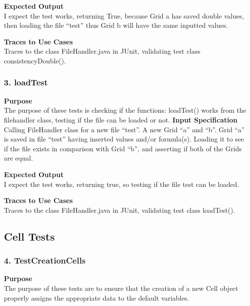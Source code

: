 \documentclass[12pt]{article}
\begin{document}
\noindent
{\bf Expected Output}\\
I expect the test works, returning True, because Grid a has saved double values, then loading the file “test” thus Grid b will have the same inputted values.

\noindent
{\bf Traces to Use Cases}\\
Traces to the class FileHandler.java in JUnit, validating test class consistencyDouble().

\subsubsection{3. loadTest} \label{tc:1}

\noindent
{\bf Purpose}\\
The purpose of these tests is checking if the functions: loadTest() works from the filehandler class, testing if the file can be loaded or not.
\noindent
{\bf Input Specification}\\
Calling FileHandler class for a new file “test”. A new Grid “a” and “b”.  Grid “a” is saved in file “test” having inserted values and/or formula(s).  Loading it to see if the file exists in comparison with Grid “b”, and asserting if both of the Grids are equal.

\noindent
{\bf Expected Output}\\
I expect the test works, returning true, so testing if the file test can be loaded.  

\noindent
{\bf Traces to Use Cases}\\
Traces to the class FileHandler.java in JUnit, validating test class loadTest().

\subsection{Cell Tests}
\subsubsection{4. TestCreationCells} \label{tc:1}

\noindent
{\bf Purpose}\\
The purpose of these tests are to ensure that the creation of a new Cell object properly assigns the appropriate data to the default variables. 
\end{document}
